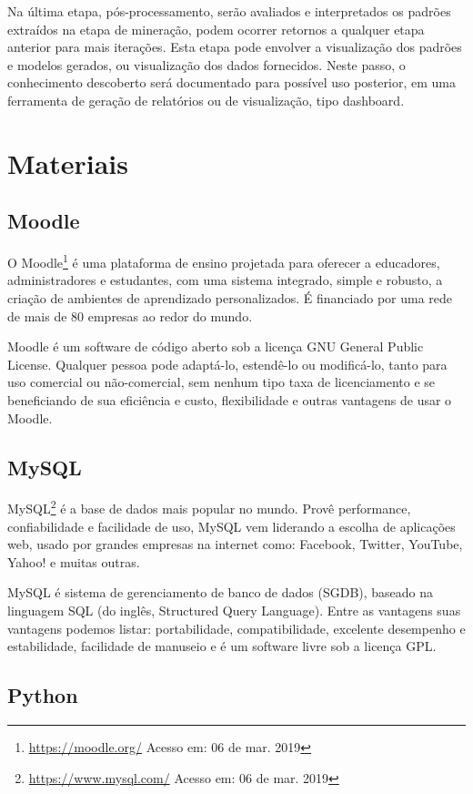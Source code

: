Na última etapa, pós-processamento, serão avaliados e interpretados os padrões
extraídos na etapa de mineração, podem ocorrer retornos a qualquer etapa
anterior para mais iterações. Esta etapa pode envolver a visualização dos
padrões e modelos gerados, ou visualização dos dados fornecidos. Neste passo, o
conhecimento descoberto será documentado para possível uso posterior, em uma
ferramenta de geração de relatórios ou de visualização, tipo dashboard.

\section{Materiais}

\subsection{Moodle}

O Moodle\footnote{\url{https://moodle.org/} Acesso em: 06 de mar. 2019} é uma
plataforma de ensino projetada para oferecer a educadores, administradores e
estudantes, com uma sistema integrado, simple e robusto, a criação de ambientes
de aprendizado personalizados. É financiado por uma rede de mais de 80 empresas
ao redor do mundo.

Moodle é um software de código aberto sob a licença GNU General Public License.
Qualquer pessoa pode adaptá-lo, estendê-lo ou modificá-lo, tanto para uso
comercial ou não-comercial, sem nenhum tipo taxa de licenciamento e se
beneficiando de sua eficiência e custo, flexibilidade e outras vantagens de usar
o Moodle.

\subsection{MySQL}

MySQL\footnote{\url{https://www.mysql.com/} Acesso em: 06 de mar. 2019} é a base
de dados mais popular no mundo. Provê performance, confiabilidade e facilidade
de uso, MySQL vem liderando a escolha de aplicações web, usado por grandes
empresas na internet como: Facebook, Twitter, YouTube, Yahoo! e muitas outras.

MySQL é sistema de gerenciamento de banco de dados (SGDB), baseado na linguagem
SQL (do inglês, Structured Query Language). Entre as vantagens suas vantagens
podemos listar: portabilidade, compatibilidade, excelente desempenho e
estabilidade, facilidade de manuseio e é um software livre sob a licença GPL.

\subsection{Python}

